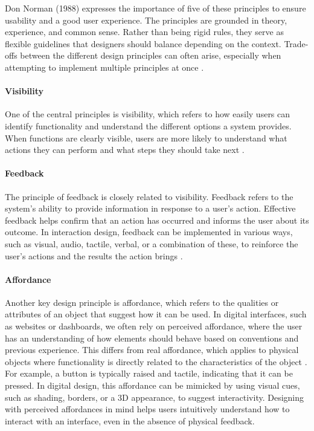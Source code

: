Don Norman (1988) expresses the importance of five of these principles to ensure usability and a good user experience. The principles are grounded in theory, experience, and common sense. Rather than being rigid rules, they serve as flexible guidelines that designers should balance depending on the context. Trade-offs between the different design principles can often arise, especially when attempting to implement multiple principles at once \autocite[p. 30]{sharp-2019}.

\paragraph{Visibility}
\label{par:visibility}


One of the central principles is visibility, which refers to how easily users can identify functionality and understand the different options a system provides. When functions are clearly visible, users are more likely to understand what actions they can perform and what steps they should take next \autocite[p. 26]{sharp-2019}.

\paragraph{Feedback}
\label{par:feedback}


The principle of feedback is closely related to visibility. Feedback refers to the system’s ability to provide information in response to a user's action. Effective feedback helps confirm that an action has occurred and informs the user about its outcome. In interaction design, feedback can be implemented in various ways, such as visual, audio, tactile, verbal, or a combination of these, to reinforce the user’s actions and the results the action brings \autocite[p. 27-28]{sharp-2019}.

\paragraph{Affordance}
\label{par:affordance}


Another key design principle is affordance, which refers to the qualities or attributes of an object that suggest how it can be used. In digital interfaces, such as websites or dashboards, we often rely on perceived affordance, where the user has an understanding of how elements should behave based on conventions and previous experience. This differs from real affordance, which applies to physical objects where functionality is directly related to the characteristics of the object \autocite[p. 29]{sharp-2019}. For example, a button is typically raised and tactile, indicating that it can be pressed. In digital design, this affordance can be mimicked by using visual cues, such as shading, borders, or a 3D appearance, to suggest interactivity. Designing with perceived affordances in mind helps users intuitively understand how to interact with an interface, even in the absence of physical feedback.

